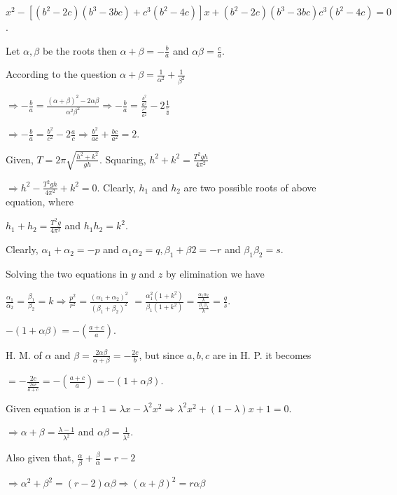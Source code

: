   $x^2 - [(b^2 - 2c)(b^3 - 3bc) + c^3(b^2 - 4c)]x + (b^2 - 2c)(b^3 - 3bc)c^3(b^2 - 4c) = 0$.
\item Let $\alpha, \beta$ be the roots then $\alpha + \beta = -\frac{b}{a}$ and $\alpha\beta = \frac{c}{a}$.

  According to the question $\alpha + \beta = \frac{1}{\alpha^2} + \frac{1}{\beta^2}$

  $\Rightarrow -\frac{b}{a} = \frac{(\alpha + \beta)^2 - 2\alpha\beta}{\alpha^2\beta^2}\Rightarrow
  -\frac{b}{a} = \frac{\frac{b^2}{a^2}}{\frac{c^2}{a^2}} - 2\frac{1}{\frac{c}{a}}$

  $\Rightarrow -\frac{b}{a} = \frac{b^2}{c^2} - 2\frac{a}{c}\Rightarrow \frac{b^2}{ac} + \frac{bc}{a^2} =
  2$.
\item Given, $T = 2\pi \sqrt{\frac{h^2 + k^2}{gh}}$. Squaring, $h^2 + k^2 = \frac{T^2gh}{4\pi^2}$

  $\Rightarrow h^2 - \frac{T^2gh}{4\pi^2} + k^2 = 0$. Clearly, $h_1$ and $h_2$ are two possible roots of
  above equation, where

  $h_1 + h_2 = \frac{T^2g}{4\pi^2}$ and $h_1h_2 = k^2$.
\item Clearly, $\alpha_1 + \alpha_2 = -p$ and $\alpha_1\alpha_2 = q, \beta_1 + \beta2 = -r$ and
  $\beta_1\beta_2 = s$.

  Solving the two equations in $y$ and $z$ by elimination we have

  $\frac{\alpha_1}{\alpha_2} = \frac{\beta_1}{\beta_2} = k\Rightarrow \frac{p^2}{r^2} = \frac{(\alpha_1 +
    \alpha_2)^2}{(\beta_1 + \beta_2)^2}$
  $= \frac{\alpha_1^2(1 + k^2)}{\beta_1(1 + k^2)} =
  \frac{\frac{\alpha_1\alpha_2}{k}}{\frac{\beta_1\beta_2}{k}} = \frac{q}{s}$.
\item $-(1 + \alpha\beta) = -(\frac{a + c}{a})$.

  H. M. of $\alpha$ and $\beta = \frac{2\alpha\beta}{\alpha + \beta} = -\frac{2c}{b}$, but since $a, b, c$
  are in H. P. it becomes

  $= -\frac{2c}{\frac{2ac}{a + c}} = -(\frac{a + c}{a}) = -(1 + \alpha\beta)$.
\item Given equation is $x + 1 = \lambda x - \lambda^2x^2\Rightarrow \lambda^2x^2 + (1 - \lambda)x + 1 = 0$.

  $\Rightarrow \alpha + \beta = \frac{\lambda - 1}{\lambda^2}$ and $\alpha\beta = \frac{1}{\lambda^2}$.

  Also given that, $\frac{\alpha}{\beta} + \frac{\beta}{\alpha} = r - 2$

  $\Rightarrow \alpha^2 + \beta^2 = (r - 2)\alpha\beta\Rightarrow (\alpha + \beta)^2 = r\alpha\beta$

